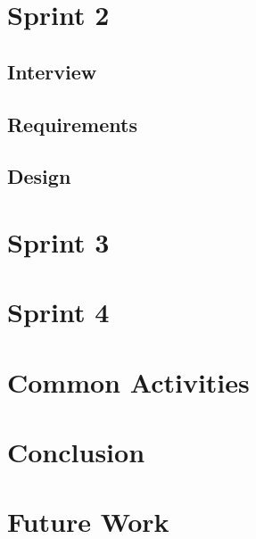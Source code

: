 \chapter{Sprint 2}


\newpage

\section{Interview}\label{s2interview}


\section{Requirements}\label{s2requirements}


\section{Design}











\chapter{Sprint 3}

\chapter{Sprint 4}

\chapter{Common Activities}

\chapter{Conclusion}


\chapter{Future Work}

